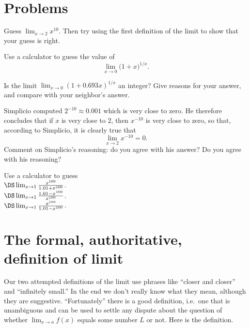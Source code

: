 \section{Problems}
\problemfont
\begin{multicols}{2}
\problem Guess $\lim_{x\to 2} x^{10}$.
Then try using the first definition of the limit to show that your
guess is right.

\problem Use a calculator to guess the value of
\[
\lim_{x\to0} \bigl(1+x\bigr)^{1/x}.
\]

\problem Is the limit
$\lim_{x\to0} (1+0.693x)^{1/x}$
an integer?  Give reasons for your answer, and compare with your
neighbor's answer.

\problem Simplicio computed $2^{-10} \approx 0.001$ which is very
close to zero.  He therefore concludes that if $x$ is very close to
$2$, then $x^{-10}$ is very close to zero, so that, according to
Simplicio, it is clearly true that
\[
\lim_{x\to2} x^{-10} = 0.
\]
Comment on Simplicio's reasoning: do you agree with his answer?  Do
you agree with his reasoning?

\problem Use a calculator to guess\\[6pt]

\subprob $\DS\lim_{x\to1} \frac{x^{100}}{1.01+x^{100}}$.\\[6pt]

\subprob $\DS\lim_{x\to1} \frac{1.01-x^{100}}{x^{100}}$.\\[6pt]

\subprob $\DS\lim_{x\to1} \frac{x^{100}}{1.01-x^{100}}$.

\end{multicols}
\noproblemfont

\section{The formal, authoritative, definition of limit}
\label{sec:formal-limit-def} Our two attempted definitions of the limit
use phrases like ``closer and closer'' and ``infinitely small.''
In the end we don't really know what they mean, although they are
suggestive.  ``Fortunately'' there is a good definition, i.e.\ one
that is unambiguous and can be used to settle any dispute about the
question of whether $\lim_{x\to a} f(x)$ equals some number $L$ or
not.  Here is the definition.  

